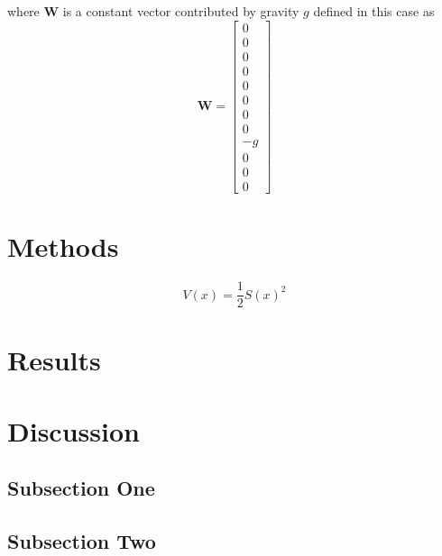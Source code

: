 \documentclass{article}
\begin{document}
where \textbf{W} is a constant vector contributed by gravity $g$ defined in this case as
{\scriptsize\begin{equation}
	\textbf{W}=\left[\begin{array}{c}
	0\\
	0\\
	0\\
	0\\
	0\\
	0\\
	0\\
	0\\
	-g\\
	0\\
	0\\
	0
	\end{array}\right]
	\end{equation}}



\section{Methods}

\begin{equation}
V(x) = \frac{1}{2}S(x)^{2}
\end{equation}


\section{Results}


\section{Discussion}

\subsection{Subsection One}

\subsection{Subsection Two}


\end{document}

